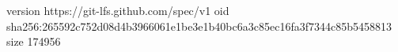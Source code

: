version https://git-lfs.github.com/spec/v1
oid sha256:265592c752d08d4b3966061e1be3e1b40bc6a3c85ec16fa3f7344c85b5458813
size 174956
